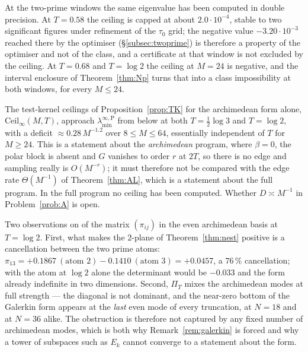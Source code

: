 \documentclass[11pt]{amsart}
\theoremstyle{definition}
\theoremstyle{remark}
\newcommand{\PiT}{\Pi_T}
\newcommand{\laminfP}{\lambda^{\infty,\mathrm P}_{\min}}
\begin{document}
At the two-prime windows the same eigenvalue has been computed in double precision. At $T=0.58$ the ceiling is capped at about
$2.0\cdot10^{-4}$, stable to two significant figures under refinement of the $\tau_0$ grid; the
negative value $-3.20\cdot10^{-3}$ reached there by the optimiser (\S\ref{subsec:twoprime}) is
therefore a property of the optimiser and not of the class, and a certificate at that window is not
excluded by the ceiling. At $T=0.68$ and $T=\log2$ the ceiling at $M=24$ is negative, and the interval
enclosure of Theorem~\ref{thm:Np} turns that into a class impossibility at both windows, for every
$M\le24$.

The test-kernel ceilings of Proposition~\ref{prop:TK} for the archimedean form
alone, $\mathrm{Ceil}_\infty(M,T)$, approach $\laminfP$ from below at both $T=\frac12\log3$ and
$T=\log2$, with a deficit $\approx0.28\,M^{-1.2}$ over $8\le M\le64$, essentially independent of $T$
for $M\ge24$. This is a statement about the \emph{archimedean} program, where $\beta=0$, the polar
block is absent and $G$ vanishes to order $r$ at $2T$, so there is no edge and sampling really is
$O(M^{-r})$; it must therefore not be compared with the edge rate $\Theta(M^{-1})$ of
Theorem~\ref{thm:AL}, which is a statement about the full program. In the full program no ceiling
has been computed. Whether $D\asymp M^{-1}$ in Problem~\ref{prob:A} is open.

Two observations on of the matrix $(\pi_{ij})$ in the even archimedean basis at
$T=\log2$. First, what makes the $2$-plane of Theorem~\ref{thm:nest} positive is a cancellation
between the two prime atoms: $\pi_{13}=+0.1867\ (\text{atom }2)-0.1410\ (\text{atom }3)=+0.0457$, a
$76\,\%$ cancellation; with the atom at $\log2$ alone the determinant would be $-0.033$ and the form
already indefinite in two dimensions. Second, $\PiT$ mixes the archimedean modes at full strength ---
the diagonal is not dominant, and the near-zero bottom of the Galerkin form appears at the
\emph{last} even mode of every truncation, at $N=18$ and at $N=36$ alike. The obstruction is therefore
not captured by any fixed number of archimedean modes, which is both why Remark~\ref{rem:galerkin} is
forced and why a tower of subspaces such as $E_k$ cannot converge to a statement about the form.
\end{document}
